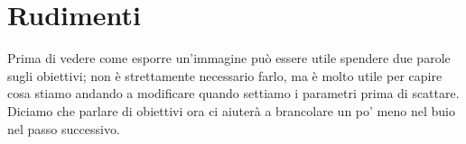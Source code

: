 \chapter{Rudimenti} \label{ch:rudimenti}

Prima di vedere come esporre un'immagine può essere utile spendere due parole sugli obiettivi; non è strettamente necessario farlo, ma è molto utile per capire cosa stiamo andando a modificare quando settiamo i parametri prima di scattare. Diciamo che parlare di obiettivi ora ci aiuterà a brancolare un po' meno nel buio nel passo successivo.

\pagebreak